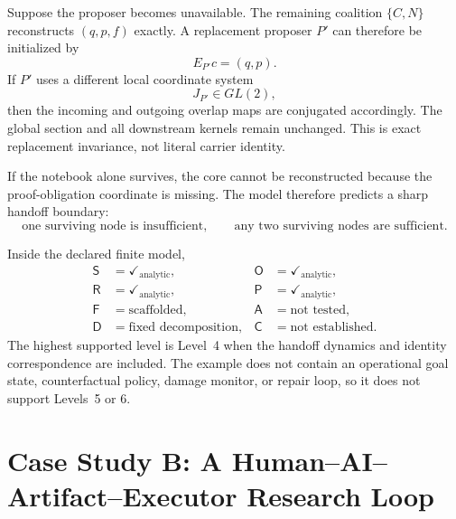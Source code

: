 Suppose the proposer becomes unavailable. The remaining coalition \(\{C,N\}\)
reconstructs \((q,p,f)\) exactly. A replacement proposer \(P'\) can therefore
be initialized by
\[
E_{P'}c=(q,p).
\]
If \(P'\) uses a different local coordinate system
\[
J_{P'}\in GL(2),
\]
then the incoming and outgoing overlap maps are conjugated accordingly. The
global section and all downstream kernels remain unchanged. This is exact
replacement invariance, not literal carrier identity.

If the notebook alone survives, the core cannot be reconstructed because the
proof-obligation coordinate is missing. The model therefore predicts a sharp
handoff boundary:
\[
\text{one surviving node is insufficient},
\qquad
\text{any two surviving nodes are sufficient}.
\]


Inside the declared finite model,
\[
\boxed{
\begin{aligned}
\mathsf S&=\checkmark_{\mathrm{analytic}},
&\mathsf O&=\checkmark_{\mathrm{analytic}},\\
\mathsf R&=\checkmark_{\mathrm{analytic}},
&\mathsf P&=\checkmark_{\mathrm{analytic}},\\
\mathsf F&=\text{scaffolded},
&\mathsf A&=\text{not tested},\\
\mathsf D&=\text{fixed decomposition},
&\mathsf C&=\text{not established}.
\end{aligned}
}
\]
The highest supported level is Level~4 when the handoff dynamics and identity
correspondence are included. The example does not contain an operational goal
state, counterfactual policy, damage monitor, or repair loop, so it does not
support Levels~5 or 6.

\section{Case Study B: A Human--AI--Artifact--Executor Research Loop}


